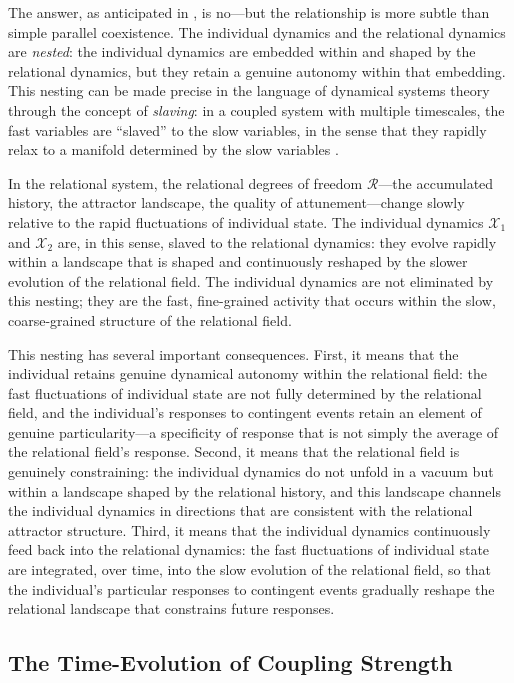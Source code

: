 The answer, as anticipated in , is no---but the relationship is more subtle than simple parallel coexistence. The individual dynamics and the relational dynamics are \emph{nested}: the individual dynamics are embedded within and shaped by the relational dynamics, but they retain a genuine autonomy within that embedding. This nesting can be made precise in the language of dynamical systems theory through the concept of \emph{slaving}: in a coupled system with multiple timescales, the fast variables are ``slaved'' to the slow variables, in the sense that they rapidly relax to a manifold determined by the slow variables \parencite{strogatz2001}.

In the relational system, the relational degrees of freedom $\mathcal{R}$---the accumulated history, the attractor landscape, the quality of attunement---change slowly relative to the rapid fluctuations of individual state. The individual dynamics $\mathcal{X}_1$ and $\mathcal{X}_2$ are, in this sense, slaved to the relational dynamics: they evolve rapidly within a landscape that is shaped and continuously reshaped by the slower evolution of the relational field. The individual dynamics are not eliminated by this nesting; they are the fast, fine-grained activity that occurs within the slow, coarse-grained structure of the relational field.

This nesting has several important consequences. First, it means that the individual retains genuine dynamical autonomy within the relational field: the fast fluctuations of individual state are not fully determined by the relational field, and the individual's responses to contingent events retain an element of genuine particularity---a specificity of response that is not simply the average of the relational field's response. Second, it means that the relational field is genuinely constraining: the individual dynamics do not unfold in a vacuum but within a landscape shaped by the relational history, and this landscape channels the individual dynamics in directions that are consistent with the relational attractor structure. Third, it means that the individual dynamics continuously feed back into the relational dynamics: the fast fluctuations of individual state are integrated, over time, into the slow evolution of the relational field, so that the individual's particular responses to contingent events gradually reshape the relational landscape that constrains future responses.

\subsection{The Time-Evolution of Coupling Strength}
\label{p14:subsec:coupling}

